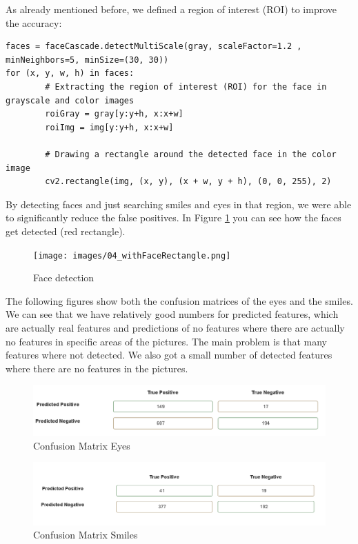 \documentclass[11pt, a4paper, twocolumn]{article}
\begin{document}
As already mentioned before, we defined a region of interest (ROI) to improve the accuracy:
\begin{lstlisting}
faces = faceCascade.detectMultiScale(gray, scaleFactor=1.2 , minNeighbors=5, minSize=(30, 30))
for (x, y, w, h) in faces:
        # Extracting the region of interest (ROI) for the face in grayscale and color images
        roiGray = gray[y:y+h, x:x+w] 
        roiImg = img[y:y+h, x:x+w]

        # Drawing a rectangle around the detected face in the color image
        cv2.rectangle(img, (x, y), (x + w, y + h), (0, 0, 255), 2)
\end{lstlisting}
By detecting faces and just searching smiles and eyes in that region, we were able to significantly reduce the false positives. In Figure \ref{fig:04_withFaces} you can see how the faces get detected (red rectangle). 
%
\begin{figure}[H]
 \texttt{[image: images/04\_withFaceRectangle.png]}
 \centering
 \setlength{\abovecaptionskip}{1pt}
 \caption{Face detection}
 \label{fig:04_withFaces}
\end{figure}

The following figures show both the confusion matrices of the eyes and the smiles. We can see that we have relatively good numbers for predicted features, which are actually real features and predictions of no features where there are actually no features in specific areas of the pictures. The main problem is that many features where not detected. We also got a small number of detected features where there are no features in the pictures.

\begin{figure}[H]
 \includegraphics[width=1\columnwidth]{images/ConfusionMatrixEyes.PNG}
 \centering
 \setlength{\abovecaptionskip}{1pt}
 \caption{Confusion Matrix Eyes}
 \label{fig:ConfEyes}
\end{figure}

\begin{figure}[H]
 \includegraphics[width=1\columnwidth]{images/ConfusionMatrixSmiles.PNG}
 \centering
 \setlength{\abovecaptionskip}{1pt}
 \caption{Confusion Matrix Smiles}
 \label{fig:ConfSmiles}
\end{figure}
\end{document}
